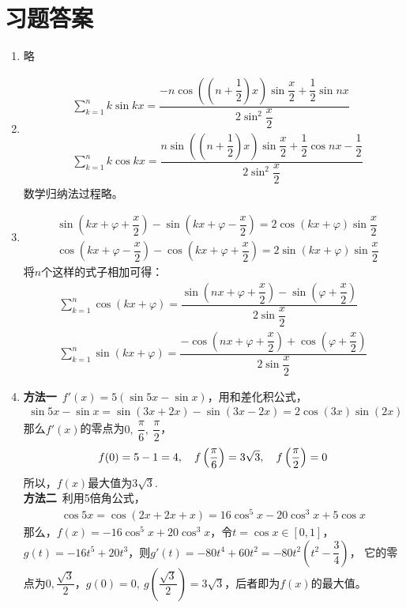 \section{习题答案}
\begin{enumerate}[label={\textbf{\thechapter.\arabic*}},leftmargin=
    \inteval{\myenumleftmargin}pt]

\item 略

\item \begin{align*}
    &\sum_{k=1}^{n}k\sin kx=
    \dfrac{-n\cos\left(\left(n+\dfrac{1}{2}\right)x\right)
        \sin\dfrac{x}{2}+\dfrac{1}{2}\sin nx}{2\sin^2 \dfrac{x}{2}} \\
    &\sum_{k=1}^{n}k\cos kx=
   \dfrac{n\sin\left(\left(n+\dfrac{1}{2}\right)x\right)\sin\dfrac{x}{2}
       +\dfrac{1}{2}\cos nx-\dfrac{1}{2}}{2\sin^2\dfrac{x}{2}} 
\end{align*}
数学归纳法过程略。

\item 
\begin{align*}
    &\sin\left(kx+\varphi+\dfrac{x}{2}\right)-
    \sin\left(kx+\varphi-\dfrac{x}{2}\right)=
    2\cos\left(kx+\varphi\right)\sin \dfrac{x}{2} \\
    &\cos\left(kx+\varphi-\dfrac{x}{2}\right)-
    \cos\left(kx+\varphi+\dfrac{x}{2}\right)=
    2\sin\left(kx+\varphi\right)\sin \dfrac{x}{2} 	
\end{align*}
将$ n $个这样的式子相加可得：
\begin{align}
    \sum_{k=1}^{n}\cos(kx+\varphi)=
    \dfrac{\sin\left(nx+\varphi+\dfrac{x}{2}\right)-\sin 
        \left(\varphi+\dfrac{x}{2}\right)}{2\sin \dfrac{x}{2}} 
        \label{余弦kx+phi求和}  \\
    \sum_{k=1}^{n}\sin(kx+\varphi)=
    \dfrac{-\cos\left(nx+\varphi+\dfrac{x}{2}\right)+\cos 
        \left(\varphi+\dfrac{x}{2}\right)}{2\sin \dfrac{x}{2}}
        \label{正弦kx+phi求和}
\end{align}

\item \textbf{方法一}\ $f'(x)=5(\sin5x-\sin x)$，用和差化积公式，
\begin{gather*}
    \sin5x-\sin x=\sin(3x+2x)-\sin(3x-2x)=2\cos(3x)\sin(2x) 
\end{gather*}
那么$f'(x)$的零点为$0,\ \dfrac{\pi}{6},\ \dfrac{\pi}{2} $，
\begin{align*}
    f(0)=5-1=4,\quad 
    f\left(\dfrac{\pi}{6}\right)=3\sqrt{3}, \quad
    f\left(\dfrac{\pi}{2}\right)=0 
\end{align*}
所以，$f(x)$最大值为$3\sqrt{3}$. \\
\textbf{方法二}\ 利用5倍角公式，
\begin{align*}
    \cos 5x=\cos(2x+2x+x)=16\cos^5 x- 20\cos^3 x+5\cos x 
\end{align*}
那么，$f(x)=-16\cos^5 x+20\cos^3 x $，令$t=\cos x\in[0,1]$，
$g(t)=-16t^5+20t^3$，则$g'(t)=-80t^4+60t^2=-80t^2\left(t^2-\dfrac{3}{4}\right)$，
它的零点为$ 0, \dfrac{\sqrt{3}}{2} $，$g(0)=0,\ 
g\left(\dfrac{\sqrt{3}}{2}\right)=3\sqrt{3} $，后者即为$f(x)$的最大值。


\end{enumerate}
